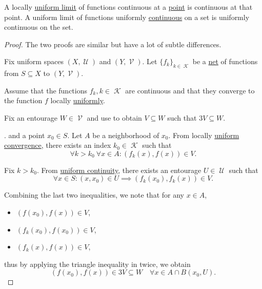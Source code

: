 \begin{proposition}\label{thm:uniform_limit_of_continuous_functions}
  \hfill
  \begin{propenum}
     A locally \hyperref[def:function_net_convergence]{uniform limit} of functions continuous at a \hyperref[thm:uniform_space_local_continuity]{point} is continuous at that point.
     A uniform limit of functions uniformly \hyperref[def:uniform_continuity]{continuous} on a set is uniformly continuous on the set.
  \end{propenum}
\end{proposition}
\begin{proof}
  The two proofs are similar but have a lot of subtle differences.

  Fix uniform spaces \( (X, \mscrU) \) and \( (Y, \mscrV) \). Let \( \{ f_k \}_{k \in \mscrK} \) be a \hyperref[def:topological_net]{net} of functions from \( S \subseteq X \) to \( (Y, \mscrV) \).

   Assume that the functions \( f_k, k \in \mscrK \) are continuous and that they converge to the function \( f \) locally \hyperref[def:function_net_convergence/locally_uniform]{uniformly}.

  Fix an entourage \( W \in \mscrV \) and use  to obtain \( V \subseteq W \) such that \( 3V \subseteq W \).

  . and a point \( x_0 \in S \). Let \( A \) be a neighborhood of \( x_0 \). From locally \hyperref[def:function_net_convergence]{uniform convergence}, there exists an index \( k_0 \in \mscrK \) such that
  \begin{equation*}
    \forall k > k_0 \ \forall x \in A : (f_k(x), f(x)) \in V.
  \end{equation*}

  Fix \( k > k_0 \). From \hyperref[def:function_net_convergence/locally_uniform]{uniform continuity}, there exists an entourage \( U \in \mscrU \) such that
  \begin{equation*}
    \forall x \in S : (x, x_0) \in U \implies (f_k(x_0), f_k(x)) \in V.
  \end{equation*}

  Combining the last two inequalities, we note that for any \( x \in A \),
  \begin{itemize}
    \item \( (f(x_0), f(x)) \in V \),
    \item \( (f_k(x_0), f(x_0)) \in V \),
    \item \( (f_k(x), f(x)) \in V \),
  \end{itemize}
  thus by applying the triangle inequality in  twice, we obtain
  \begin{equation*}
    (f(x_0), f(x)) \in 3V \subseteq W \quad\forall x \in A \cap B(x_0, U).
  \end{equation*}


\end{proof}
